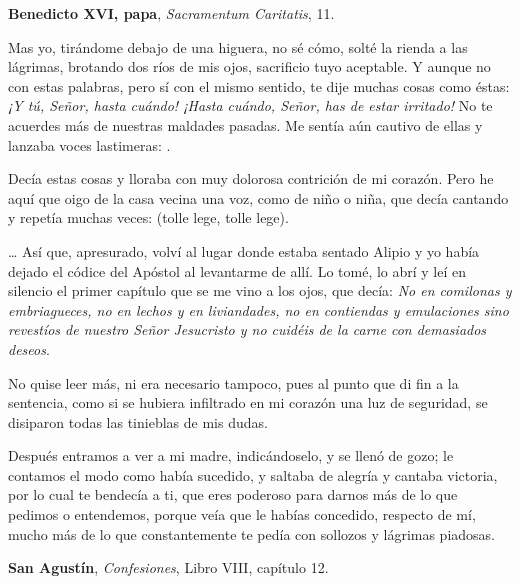 \newpage

\begin{liturgiabox}{}
	\begin{quote}	
	\end{quote}	
	
	\begin{liturgiatext}	
		\textbf{Benedicto XVI, papa}, \emph{Sacramentum Caritatis}, 11.
	\end{liturgiatext}
	
\end{liturgiabox}


\begin{patercite}
	Mas yo, tirándome debajo de una higuera, no sé cómo, solté la rienda a las lágrimas, brotando dos ríos de mis ojos, sacrificio tuyo aceptable. Y aunque no con estas palabras, pero sí con el mismo sentido, te dije muchas cosas como éstas: \emph{¡Y tú, Señor, hasta cuándo! ¡Hasta cuándo, Señor, has de estar irritado!} No te acuerdes más de nuestras maldades pasadas. Me sentía aún cautivo de ellas y lanzaba voces lastimeras: .
	
	Decía estas cosas y lloraba con muy dolorosa contrición de mi corazón. Pero he aquí que oigo de la casa vecina una voz, como de niño o niña, que decía cantando y repetía muchas veces:  (tolle lege, tolle lege).
	
	\ldots{} Así que, apresurado, volví al lugar donde estaba sentado Alipio y yo había dejado el códice del Apóstol al levantarme de allí. Lo tomé, lo abrí y leí en silencio el primer capítulo que se me vino a los ojos, que decía: \emph{No en comilonas y embriagueces, no en lechos y en liviandades, no en contiendas y emulaciones sino revestíos de nuestro Señor Jesucristo y no cuidéis de la carne con demasiados deseos}.
	
	No quise leer más, ni era necesario tampoco, pues al punto que di fin a la sentencia, como si se hubiera infiltrado en mi corazón una luz de seguridad, se disiparon todas las tinieblas de mis dudas.
	
	Después entramos a ver a mi madre, indicándoselo, y se llenó de gozo; le contamos el modo como había sucedido, y saltaba de alegría y cantaba victoria, por lo cual te bendecía a ti, que eres poderoso para darnos más de lo que pedimos o entendemos, porque veía que le habías concedido, respecto de mí, mucho más de lo que constantemente te pedía con sollozos y lágrimas piadosas.
	
	\textbf{San Agustín}, \emph{Confesiones}, Libro VIII, capítulo 12.
\end{patercite}


